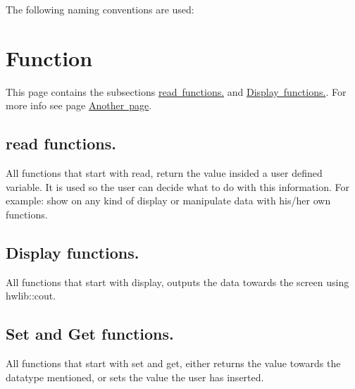 The following naming conventions are used\+: \hypertarget{_naming_sec}{}\section{Function}\label{_naming_sec}
This page contains the subsections \mbox{\hyperlink{_naming_subsection1}{read functions.}} and \mbox{\hyperlink{_naming_subsection2}{Display functions.}}. For more info see page \mbox{\hyperlink{page2}{Another page}}. \hypertarget{_naming_subsection1}{}\subsection{read functions.}\label{_naming_subsection1}
All functions that start with read, return the value insided a user defined variable. It is used so the user can decide what to do with this information. For example\+: show on any kind of display or manipulate data with his/her own functions. \hypertarget{_naming_subsection2}{}\subsection{Display functions.}\label{_naming_subsection2}
All functions that start with display, outputs the data towards the screen using hwlib\+::cout. \hypertarget{_naming_subsection3}{}\subsection{Set and Get functions.}\label{_naming_subsection3}
All functions that start with set and get, either returns the value towards the datatype mentioned, or sets the value the user has inserted. 